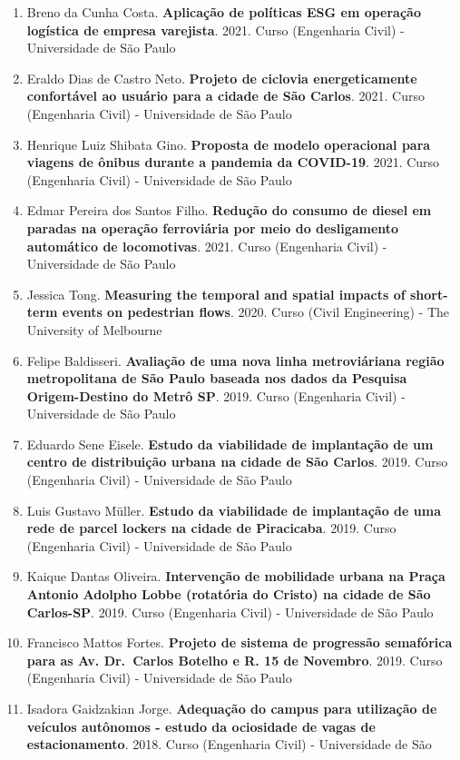 \documentclass[
  brazilian,
  11pt,
  a4paper,
]{article}
\begin{document}
\begin{enumerate}
\item
  Breno da Cunha Costa. \textbf{Aplicação de políticas ESG em operação
  logística de empresa varejista}. 2021. Curso (Engenharia Civil) -
  Universidade de São Paulo
\item
  Eraldo Dias de Castro Neto. \textbf{Projeto de ciclovia
  energeticamente confortável ao usuário para a cidade de São Carlos}.
  2021. Curso (Engenharia Civil) - Universidade de São Paulo
\item
  Henrique Luiz Shibata Gino. \textbf{Proposta de modelo operacional
  para viagens de ônibus durante a pandemia da COVID-19}. 2021. Curso
  (Engenharia Civil) - Universidade de São Paulo
\item
  Edmar Pereira dos Santos Filho. \textbf{Redução do consumo de diesel
  em paradas na operação ferroviária por meio do desligamento automático
  de locomotivas}. 2021. Curso (Engenharia Civil) - Universidade de São
  Paulo
\item
  Jessica Tong. \textbf{Measuring the temporal and spatial impacts of
  short-term events on pedestrian flows}. 2020. Curso (Civil
  Engineering) - The University of Melbourne
\item
  Felipe Baldisseri. \textbf{Avaliação de uma nova linha metroviáriana
  região metropolitana de São Paulo baseada nos dados da Pesquisa
  Origem-Destino do Metrô SP}. 2019. Curso (Engenharia Civil) -
  Universidade de São Paulo
\item
  Eduardo Sene Eisele. \textbf{Estudo da viabilidade de implantação de
  um centro de distribuição urbana na cidade de São Carlos}. 2019. Curso
  (Engenharia Civil) - Universidade de São Paulo
\item
  Luis Gustavo Müller. \textbf{Estudo da viabilidade de implantação de
  uma rede de parcel lockers na cidade de Piracicaba}. 2019. Curso
  (Engenharia Civil) - Universidade de São Paulo
\item
  Kaique Dantas Oliveira. \textbf{Intervenção de mobilidade urbana na
  Praça Antonio Adolpho Lobbe (rotatória do Cristo) na cidade de São
  Carlos-SP}. 2019. Curso (Engenharia Civil) - Universidade de São Paulo
\item
  Francisco Mattos Fortes. \textbf{Projeto de sistema de progressão
  semafórica para as Av. Dr.~Carlos Botelho e R. 15 de Novembro}. 2019.
  Curso (Engenharia Civil) - Universidade de São Paulo
\item
  Isadora Gaidzakian Jorge. \textbf{Adequação do campus para utilização
  de veículos autônomos - estudo da ociosidade de vagas de
  estacionamento}. 2018. Curso (Engenharia Civil) - Universidade de São

\end{enumerate}
\end{document}
